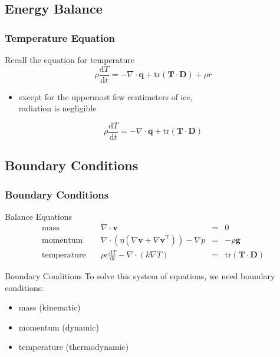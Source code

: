 \documentclass[hide notes,intlimits]{beamer}
\begin{document}
\subsection{Energy Balance}

\begin{frame}
  \frametitle{Temperature Equation}
  Recall the equation for temperature
  \begin{equation}
    \rho\frac{\text{d} T}{\text{d} t} = - \nabla \cdot \mathbf{q} + \text{tr} \left(\mathbf{T}\cdot\mathbf{D}\right) + \rho r
  \end{equation}
  \begin{itemize}
  \item except for the uppermost few centimeters of ice,\\ radiation is negligible
 \end{itemize}
  \begin{equation}
    \rho\frac{\text{d} T}{\text{d} t} = - \nabla \cdot \mathbf{q} + \text{tr} \left(\mathbf{T}\cdot\mathbf{D}\right)
  \end{equation}
\end{frame}



\subsection{Boundary Conditions}


\begin{frame}
  \frametitle{Boundary Conditions}
  \begin{block}{Balance Equations}
    \begin{equation*}
      \begin{array}{lrcl}
        \text{mass} \quad &  \nabla \cdot \mathbf{v}  & = & 0\\[.25em]
        \text{momentum} \quad &  \nabla \cdot \left(\eta\left(\nabla \mathbf{v} + \nabla \mathbf{v}^{\text{T}}\right)\right)- \nabla p & = &  -\rho\mathbf{g} \\[.25em]
        \text{temperature} \quad & \rho c\frac{\text{d} T}{\text{d} t} - \nabla \cdot \left(k \nabla T\right) & = &  \text{tr} \left(\mathbf{T}\cdot\mathbf{D}\right) 
      \end{array}
    \end{equation*}
  \end{block}
 \begin{block}{Boundary Conditions} 
  To solve this system of equations, we need boundary conditions:
  \begin{itemize}
  \item mass (kinematic)
  \item momentum (dynamic)
  \item temperature (thermodynamic)
  \end{itemize}
  \end{block}
\end{frame}
\end{document}
